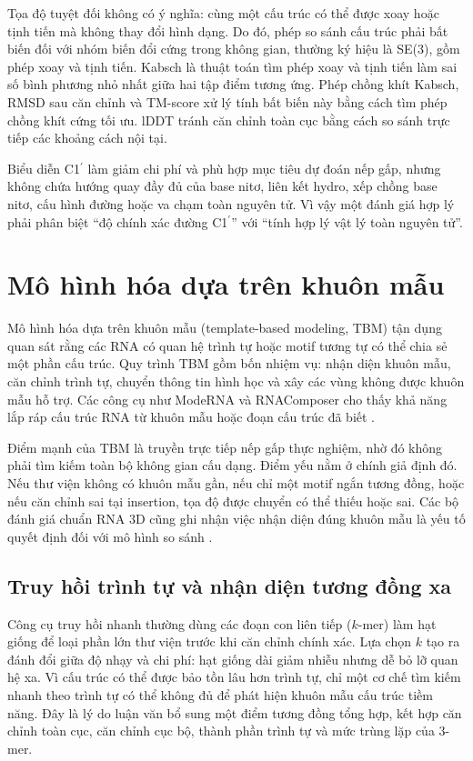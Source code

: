 \documentclass[12pt,a4paper,oneside]{report}
\newcommand{\cprime}{C1$^{\prime}$}
\begin{document}
Tọa độ tuyệt đối không có ý nghĩa: cùng một cấu trúc có thể được xoay hoặc tịnh tiến mà
không thay đổi hình dạng. Do đó, phép so sánh cấu trúc phải bất biến đối với nhóm biến
đổi cứng trong không gian, thường ký hiệu là SE(3), gồm phép xoay và tịnh tiến. Kabsch
là thuật toán tìm phép xoay và tịnh tiến làm sai số bình phương nhỏ nhất giữa hai tập
điểm tương ứng. Phép chồng khít Kabsch, RMSD sau căn chỉnh và TM-score xử lý tính bất
biến này bằng cách tìm phép chồng khít cứng tối ưu. lDDT tránh căn chỉnh toàn cục bằng
cách so sánh trực tiếp các khoảng cách nội tại.

Biểu diễn \cprime{} làm giảm chi phí và phù hợp mục tiêu dự đoán nếp gấp, nhưng không
chứa hướng quay đầy đủ của base nitơ, liên kết hydro, xếp chồng base nitơ, cấu hình đường hoặc va
chạm toàn nguyên tử. Vì vậy một đánh giá hợp lý phải phân biệt ``độ chính xác đường
\cprime{}'' với ``tính hợp lý vật lý toàn nguyên tử''.

\section{Mô hình hóa dựa trên khuôn mẫu}

Mô hình hóa dựa trên khuôn mẫu (template-based modeling, TBM) tận dụng quan sát rằng các
RNA có quan hệ trình tự hoặc motif tương tự có thể chia sẻ một phần cấu trúc. Quy trình
TBM gồm bốn nhiệm vụ: nhận diện khuôn mẫu, căn chỉnh trình tự, chuyển thông tin hình học
và xây các vùng không được khuôn mẫu hỗ trợ. Các công cụ như ModeRNA và RNAComposer cho
thấy khả năng lắp ráp cấu trúc RNA từ khuôn mẫu hoặc đoạn cấu trúc đã biết
\cite{rna_composer,rna_puzzles}.

Điểm mạnh của TBM là truyền trực tiếp nếp gấp thực nghiệm, nhờ đó không phải tìm kiếm
toàn bộ không gian cấu dạng. Điểm yếu nằm ở chính giả định đó. Nếu thư viện không có
khuôn mẫu gần, nếu chỉ một motif ngắn tương đồng, hoặc nếu căn chỉnh sai tại insertion,
tọa độ được chuyển có thể thiếu hoặc sai. Các bộ đánh giá chuẩn RNA 3D cũng ghi nhận việc nhận
diện đúng khuôn mẫu là yếu tố quyết định đối với mô hình so sánh
\cite{state_of_rnart,rna_progress_review}.

\subsection{Truy hồi trình tự và nhận diện tương đồng xa}

Công cụ truy hồi nhanh thường dùng các đoạn con liên tiếp ($k$-mer) làm hạt giống để
loại phần lớn thư viện trước khi căn chỉnh chính xác. Lựa chọn $k$ tạo ra đánh đổi giữa
độ nhạy và chi phí: hạt giống dài giảm nhiễu nhưng dễ bỏ lỡ quan hệ xa. Vì cấu trúc có
thể được bảo tồn lâu hơn trình tự, chỉ một cơ chế tìm kiếm nhanh theo trình tự có thể
không đủ để phát hiện khuôn mẫu cấu trúc tiềm năng. Đây là lý do luận văn bổ sung một
điểm tương đồng tổng hợp, kết hợp căn chỉnh toàn cục, căn chỉnh cục bộ, thành phần trình
tự và mức trùng lặp của 3-mer.
\end{document}
